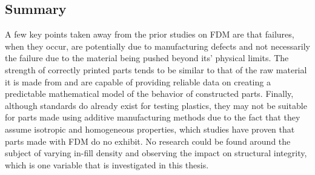 \subsection{Summary}
	
	A few key points taken away from the prior studies on FDM are that failures, when they occur, are potentially due to manufacturing defects and not necessarily the failure due to the material being pushed beyond its' physical limits. The strength of correctly printed parts tends to be similar to that of the raw material it is made from and are capable of providing reliable data on creating a predictable mathematical model of the behavior of constructed parts. Finally, although standards do already exist for testing plastics, they may not be suitable for parts made using additive manufacturing methods due to the fact that they assume isotropic and homogeneous properties, which studies have proven that parts made with FDM do no exhibit. No research could be found around the subject of varying in-fill density and observing the impact on structural integrity, which is one variable that is investigated in this thesis.
